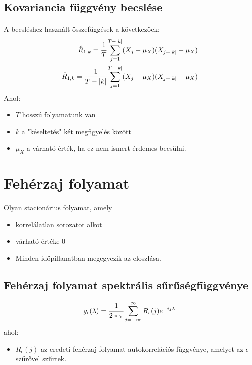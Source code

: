 \documentclass[11pt,a4paper]{article}
\begin{document}
			\subsection{Kovariancia függvény becslése}
				\paragraph{}
					A becsléshez használt összefüggések a következőek:
					$$
					\begin{aligned}
						\hat{R}_{1,k} = \cfrac{1}{T}\sum_{j=1}^{T -|k|}(X_j - \mu_X)(X_{j+|k|} -\mu_X) \\
						\bar{R}_{1,k} = \cfrac{1}{T-|k|} \sum_{j=1}^{T - |k|}(X_j - \mu_X)(X_{j+ |k|} - \mu_X) 
					\end{aligned}$$
					Ahol:
					\begin{itemize}
						\item $T$ hosszú folyamatunk van
						\item $k$ a "késeltetés" két megfigyelés között
						\item $\mu_X$ a várható érték, ha ez nem ismert érdemes becsülni.
					\end{itemize}
		\section{Fehérzaj folyamat}
			\paragraph{}
				Olyan stacionárius folyamat, amely
				\begin{itemize}
					\item korrelálatlan sorozatot alkot
					\item várható értéke 0
					\item Minden időpillanatban megegyezik az eloszlása.
				\end{itemize}
			\subsection{Fehérzaj folyamat spektrális sűrűségfüggvénye}
				$$g_\epsilon (\lambda) = \cfrac{1}{2* \pi} \sum_{j = - \infty}^{\infty} R_{\epsilon}(j)e^{-i j \lambda}$$
				ahol:
				\begin{itemize}
					\item $R_\epsilon(j)$ az eredeti fehérzaj folyamat autokorrelációs függvénye, amelyet az $\epsilon$ szűrővel szűrtek.
				\end{itemize}
\end{document}
